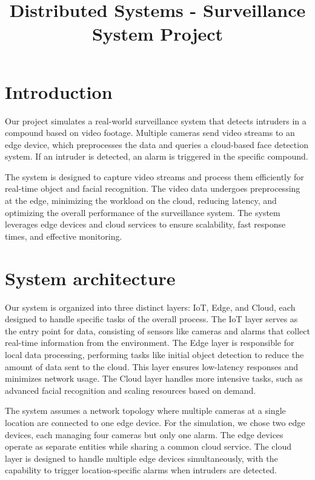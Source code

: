 \documentclass[conference]{IEEEtran}
\begin{document}
\title{Distributed Systems - Surveillance System Project}

\author{
\and 
{}
\and
{}
}

\maketitle

\section{Introduction}
Our project simulates a real-world surveillance system that detects intruders in a compound based on video footage. Multiple cameras send video streams to an edge device, which preprocesses the data and queries a cloud-based face detection system. If an intruder is detected, an alarm is triggered in the specific compound.

The system is designed to capture video streams and process them efficiently for real-time object and facial recognition. The video data undergoes preprocessing at the edge, minimizing the workload on the cloud, reducing latency, and optimizing the overall performance of the surveillance system. The system leverages edge devices and cloud services to ensure scalability, fast response times, and effective monitoring.  

\section{System architecture}
Our system is organized into three distinct layers: IoT, Edge, and Cloud, each designed to handle specific tasks of the overall process. The IoT layer serves as the entry point for data, consisting of sensors like cameras and alarms that collect real-time information from the environment. The Edge layer is responsible for local data processing, performing tasks like initial object detection to reduce the amount of data sent to the cloud. This layer ensures low-latency responses and minimizes network usage. The Cloud layer handles more intensive tasks, such as advanced facial recognition and scaling resources based on demand. 

The system assumes a network topology where multiple cameras at a single location are connected to one edge device. For the simulation, we chose two edge devices, each managing four cameras but only one alarm. The edge devices operate as separate entities while sharing a common cloud service. The cloud layer is designed to handle multiple edge devices simultaneously, with the capability to trigger location-specific alarms when intruders are detected.
\end{document}
